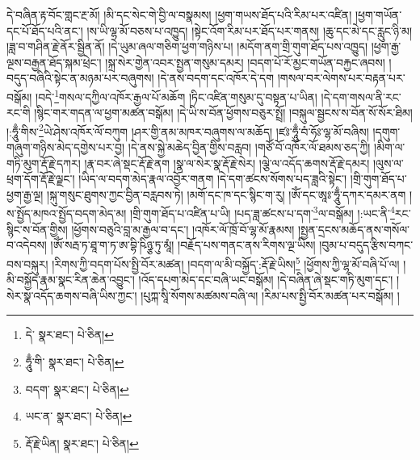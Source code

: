 དེ་བཞིན་རྟ་བོང་གླང་རྔ་མོ། །མི་དང་སེང་གེ་བྱི་ལ་བསྣམས། །ཕྱག་གཡས་ཐོད་པའི་རིམ་པར་འཛིན། །ཕྱག་གཡོན་དང་པོ་ཐོད་པའི་ནང་། །ས་ཡི་ལྷ་མོ་བཅས་པ་འཁྱུད། །སྟེང་འོག་རིམ་པར་ཐོད་པར་གནས། །ཆུ་དང་མེ་དང་རླུང་ཉི་མ། །ཟླ་བ་གཤིན་རྗེ་ནོར་སྦྱིན་ནོ། །དེ་ཡུམ་ཞལ་གཅིག་ཕྱག་གཉིས་པ། །མདོག་ནག་གྲི་གུག་ཐོད་པས་འཁྱུད། །ཕྱག་རྒྱ་ལྔས་བརྒྱན་ཐོད་སྐམ་ཕྲེང་། །སྐྲ་སེར་གྱེན་འབར་སྤྱན་གསུམ་དམར། །བདག་པོ་རོ་མྱང་གཡོན་བརྐྱང་ཞབས། །བདུད་བཞིའི་སྟེང་ན་མཉམ་པར་བཞུགས། །དེ་ནས་བདག་དང་འཁོར་དེ་དག །གསལ་བར་ལེགས་པར་བརྟན་པར་བསྒོམ། །བདེ་\footnote{དེ་  སྣར་ཐང་།  པེ་ཅིན། }གསལ་དཀྱིལ་འཁོར་རྒྱལ་པོ་མཆོག །ཏིང་འཛིན་གསུམ་དུ་བསྟན་པ་ཡིན། །དེ་དག་གསལ་ནི་རང་རང་གི །སྙིང་གར་གདན་ལ་ཕྱག་མཚན་བསྒོམ། །དེ་ཡི་ས་བོན་ཕྱོགས་བཅུར་སྤྲོ། །བསྐུལ་སྦྱངས་ས་བོན་སོ་སོར་ཐིམ། །:ཧཱུྃ་གིས་\footnote{ཧཱུྃ་གི་  སྣར་ཐང་།  པེ་ཅིན། }ཡེ་ཤེས་འཁོར་ལོ་བཀུག །ཤར་གྱི་ནམ་མཁར་བཞུགས་ལ་མཆོད། །ཛཿ་ཧཱུྃ་བཾ་ཧོཿ་ལྷ་མོ་བཞིས། །དགུག་གཞུག་གཉིས་མེད་དགྱེས་པར་བྱ། །དེ་ནས་སྐྱེ་མཆེད་བྱིན་གྱིས་བརླབ། །གཙོ་བོ་འཁོར་ལོ་ཐམས་ཅད་ཀྱི། །མིག་ལ་གཏི་མུག་རྡོ་རྗེ་དཀར། །རྣ་བར་ཞེ་སྡང་རྡོ་རྗེ་ནག །སྣ་ལ་སེར་སྣ་རྡོ་རྗེ་སེར། །ལྕེ་ལ་འདོད་ཆགས་རྡོ་རྗེ་དམར། །ལུས་ལ་ཕྲག་དོག་རྡོ་རྗེ་ལྗང་། །ཡིད་ལ་བདག་མེད་རྣལ་འབྱོར་གནག །དེ་དག་ཚངས་སོགས་པད་ཟླའི་སྟེང་། །གྲི་གུག་ཐོད་པ་ཕྱག་རྒྱ་ལྔ། །སྐུ་གསུང་ཐུགས་ཀྱང་བྱིན་བརླབས་ཏེ། །མགོ་དང་ཁ་དང་སྙིང་ག་རུ། །ཨོཾ་དང་ཨཱཿ་ཧཱུྃ་དཀར་དམར་ནག །ས་སྤྱོད་མཁའ་སྤྱོད་བདག་མེད་མ། །གྲི་གུག་ཐོད་པ་འཛིན་པ་ཡི། །པད་ཟླ་ཚངས་པ་དག་\footnote{བདག་  སྣར་ཐང་།  པེ་ཅིན། }ལ་བསྒོམ། །:ཡང་ནི་\footnote{ཡང་ན་  སྣར་ཐང་།  པེ་ཅིན། }རང་སྙིང་ས་བོན་གྱིས། །ཕྱོགས་བཅུའི་བླ་མ་རྒྱལ་བ་དང་། །འཁོར་ལོ་ཁྲོ་བོ་ལྷ་མོ་རྣམས། །སྤྱན་དྲངས་མཆོད་ནས་གསོལ་བ་འདེབས། །ཨོཾ་སརྦ་ཏ་ཐཱ་ག་ཏ་ཨ་བྷི་ཥིཉྩ་ཏུ་མཱཾ། །བརྗོད་པས་གནང་ནས་རིགས་ལྔ་ཡིས། །བུམ་པ་བདུད་རྩིས་བཀང་བས་བསྐུར། །རིགས་ཀྱི་བདག་པོས་སྤྱི་བོར་མཚན། །བདག་ལ་མི་བསྐྱོད་:རྡོ་རྗེ་ཡིས།\footnote{རྡོ་རྗེ་ཡིན།  སྣར་ཐང་།  པེ་ཅིན། } །ཕྱོགས་ཀྱི་ལྷ་མོ་བཞི་པོ་ལ། །མི་བསྐྱོད་རྣམ་སྣང་རིན་ཆེན་འབྱུང་། །འོད་དཔག་མེད་དང་བཞི་ཡང་བསྒོམ། །དེ་བཞིན་ཞེ་སྡང་གཏི་མུག་དང་། །སེར་སྣ་འདོད་ཆགས་བཞི་ཡིས་ཀྱང་། །པུཀྐ་སཱི་སོགས་མཚམས་བཞི་ལ། །རིམ་པས་སྤྱི་བོར་མཚན་པར་བསྒོམ། །
